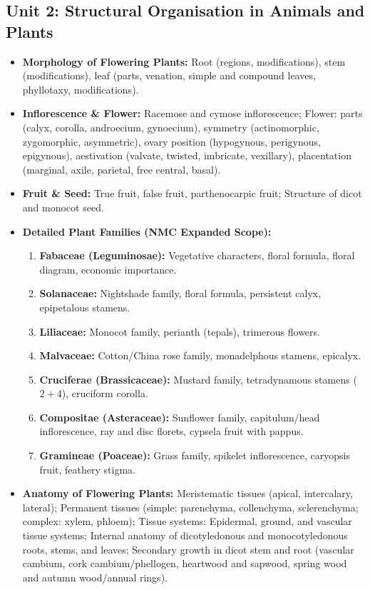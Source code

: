 \documentclass[11pt,a4paper]{article}
\begin{document}
\subsection{Unit 2: Structural Organisation in Animals and Plants}
\begin{itemize}
  \item \textbf{Morphology of Flowering Plants:} Root (regions, modifications), stem (modifications), leaf (parts, venation, simple and compound leaves, phyllotaxy, modifications).
  \item \textbf{Inflorescence \& Flower:} Racemose and cymose inflorescence; Flower: parts (calyx, corolla, androecium, gynoecium), symmetry (actinomorphic, zygomorphic, asymmetric), ovary position (hypogynous, perigynous, epigynous), aestivation (valvate, twisted, imbricate, vexillary), placentation (marginal, axile, parietal, free central, basal).
  \item \textbf{Fruit \& Seed:} True fruit, false fruit, parthenocarpic fruit; Structure of dicot and monocot seed.
  \item \textbf{Detailed Plant Families (NMC Expanded Scope):}
  \begin{enumerate}
    \item \textbf{Fabaceae (Leguminosae):} Vegetative characters, floral formula, floral diagram, economic importance.
    \item \textbf{Solanaceae:} Nightshade family, floral formula, persistent calyx, epipetalous stamens.
    \item \textbf{Liliaceae:} Monocot family, perianth (tepals), trimerous flowers.
    \item \textbf{Malvaceae:} Cotton/China rose family, monadelphous stamens, epicalyx.
    \item \textbf{Cruciferae (Brassicaceae):} Mustard family, tetradynamous stamens ($2+4$), cruciform corolla.
    \item \textbf{Compositae (Asteraceae):} Sunflower family, capitulum/head inflorescence, ray and disc florets, cypsela fruit with pappus.
    \item \textbf{Gramineae (Poaceae):} Grass family, spikelet inflorescence, caryopsis fruit, feathery stigma.
  \end{enumerate}
  \item \textbf{Anatomy of Flowering Plants:} Meristematic tissues (apical, intercalary, lateral); Permanent tissues (simple: parenchyma, collenchyma, sclerenchyma; complex: xylem, phloem); Tissue systems: Epidermal, ground, and vascular tissue systems; Internal anatomy of dicotyledonous and monocotyledonous roots, stems, and leaves; Secondary growth in dicot stem and root (vascular cambium, cork cambium/phellogen, heartwood and sapwood, spring wood and autumn wood/annual rings).

\end{itemize}
\end{document}
